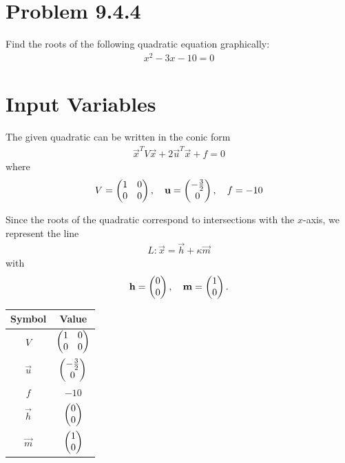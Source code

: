 \documentclass[12pt]{article}
\begin{document}
\section*{Problem 9.4.4}

Find the roots of the following quadratic equation graphically:
\begin{align}
x^2 - 3x - 10 = 0
\end{align}

\section*{Input Variables}

The given quadratic can be written in the conic form
\begin{align}
\vec{x}^T V \vec{x} + 2\vec{u}^T \vec{x} + f = 0
\end{align}
where
\begin{align}
V = \begin{pmatrix}1 & 0 \\ 0 & 0\end{pmatrix}, \quad
\mathbf{u} = \begin{pmatrix}-\tfrac{3}{2} \\ 0\end{pmatrix}, \quad
f = -10
\end{align}

Since the roots of the quadratic correspond to intersections with the $x$-axis, we represent the line
\begin{align}
L: \vec{x} = \vec{h} + \kappa \vec{m}
\end{align}
with
\begin{align}
\mathbf{h} = \begin{pmatrix}0 \\ 0\end{pmatrix}, \quad
\mathbf{m} = \begin{pmatrix}1 \\ 0\end{pmatrix}.
\end{align}

\begin{table}[H]
\centering
\begin{tabular}{|c|c|}
\hline
\textbf{Symbol} & \textbf{Value} \\
\hline
$V$ & $\begin{pmatrix}1 & 0 \\ 0 & 0\end{pmatrix}$ \\
\hline
$\vec{u}$ & $\begin{pmatrix}-\tfrac{3}{2} \\ 0\end{pmatrix}$ \\
\hline
$f$ & $-10$ \\
\hline
$\vec{h}$ & $\begin{pmatrix}0 \\ 0\end{pmatrix}$ \\
\hline
$\vec{m}$ & $\begin{pmatrix}1 \\ 0\end{pmatrix}$ \\
\hline
\end{tabular}
\end{table}
\end{document}
